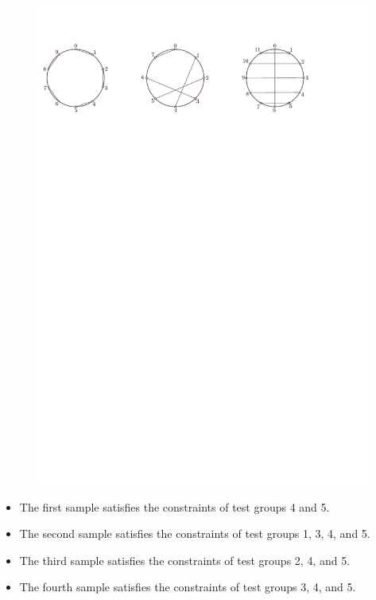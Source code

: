 \begin{figure}
\centering
\includegraphics[width=\textwidth]{sample234}
\end{figure}

\begin{itemize}
\item The first sample satisfies the constraints of test groups 4 and 5.
\item The second sample satisfies the constraints of test groups 1, 3, 4, and 5.
\item The third sample satisfies the constraints of test groups 2, 4, and 5.
\item The fourth sample satisfies the constraints of test groups 3, 4, and 5.
\end{itemize}



